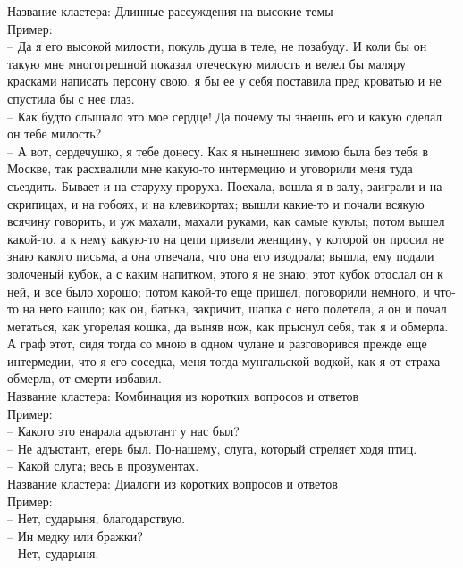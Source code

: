 \documentclass[a4paper,14pt]{article}
\begin{document}
Название кластера: Длинные рассуждения на высокие темы\\
Пример: \\
-- Да я его высокой милости, покуль душа в теле, не позабуду. И коли бы он такую мне
              многогрешной показал отеческую милость и велел бы маляру красками написать персону
              свою, я бы ее у себя поставила пред кроватью и не спустила бы с нее глаз. \\
-- Как будто слышало это мое сердце! Да почему ты знаешь его и какую сделал он тебе
              милость? \\
-- А вот, сердечушко, я тебе донесу. Как я нынешнею зимою была без тебя в Москве, так
              расхвалили мне какую-то интермецию и уговорили меня туда съездить. Бывает и на старуху
              проруха. Поехала, вошла я в залу, заиграли и на скрипицах, и на гобоях, и на
              клевикортах; вышли какие-то и почали всякую всячину говорить, и уж махали, махали
              руками, как самые куклы; потом вышел какой-то, а к нему какую-то на цепи привели
              женщину, у которой он просил не знаю какого письма, а она отвечала, что она его
              изодрала; вышла, ему подали золоченый кубок, а с каким напитком, этого я не знаю; этот
              кубок отослал он к ней, и все было хорошо; потом какой-то еще пришел, поговорили
              немного, и что-то на него нашло; как он, батька, закричит, шапка с него полетела, а он
              и почал метаться, как угорелая кошка, да выняв нож, как прыснул себя, так я и обмерла.
              А граф этот, сидя тогда со мною в одном чулане и разговорився прежде еще интермедии,
              что я его соседка, меня тогда мунгальской водкой, как я от страха обмерла, от смерти
              избавил. \\



Название кластера: Комбинация из коротких вопросов и ответов\\
Пример: \\
-- Какого это енарала адъютант у нас был? \\
-- Не адъютант, егерь был. По-нашему, слуга, который стреляет ходя птиц. \\
-- Какой слуга; весь в прозументах. \\



Название кластера: Диалоги из коротких вопросов и ответов\\
Пример: \\
-- Нет, сударыня, благодарствую. \\
-- Ин медку или бражки? \\
-- Нет, сударыня. \\
\end{document}
